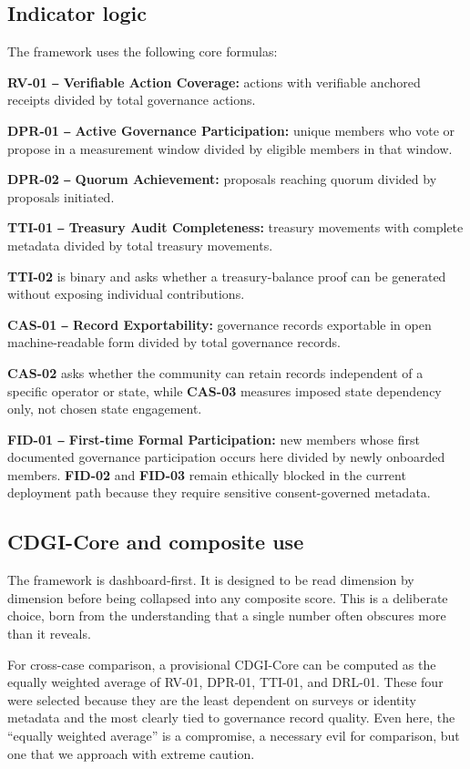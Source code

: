 \documentclass[review,onecolumn]{elsarticle}
\begin{document}
\subsection{Indicator logic}

The framework uses the following core formulas:

\textbf{RV-01 ‒ Verifiable Action Coverage:} actions with verifiable anchored receipts divided by total governance actions.

\textbf{DPR-01 ‒ Active Governance Participation:} unique members who vote or propose in a measurement window divided by eligible members in that window.

\textbf{DPR-02 ‒ Quorum Achievement:} proposals reaching quorum divided by proposals initiated.

\textbf{TTI-01 ‒ Treasury Audit Completeness:} treasury movements with complete metadata divided by total treasury movements.

\textbf{TTI-02} is binary and asks whether a treasury-balance proof can be generated without exposing individual contributions.

\textbf{CAS-01 ‒ Record Exportability:} governance records exportable in open machine-readable form divided by total governance records.

\textbf{CAS-02} asks whether the community can retain records independent of a specific operator or state, while \textbf{CAS-03} measures imposed state dependency only, not chosen state engagement.

\textbf{FID-01 ‒ First-time Formal Participation:} new members whose first documented governance participation occurs here divided by newly onboarded members. \textbf{FID-02} and \textbf{FID-03} remain ethically blocked in the current deployment path because they require sensitive consent-governed metadata.

\subsection{CDGI-Core and composite use}

The framework is dashboard-first. It is designed to be read dimension by dimension before being collapsed into any composite score. This is a deliberate choice, born from the understanding that a single number often obscures more than it reveals.

For cross-case comparison, a provisional CDGI-Core can be computed as the equally weighted average of RV-01, DPR-01, TTI-01, and DRL-01. These four were selected because they are the least dependent on surveys or identity metadata and the most clearly tied to governance record quality. Even here, the “equally weighted average” is a compromise, a necessary evil for comparison, but one that we approach with extreme caution.
\end{document}
